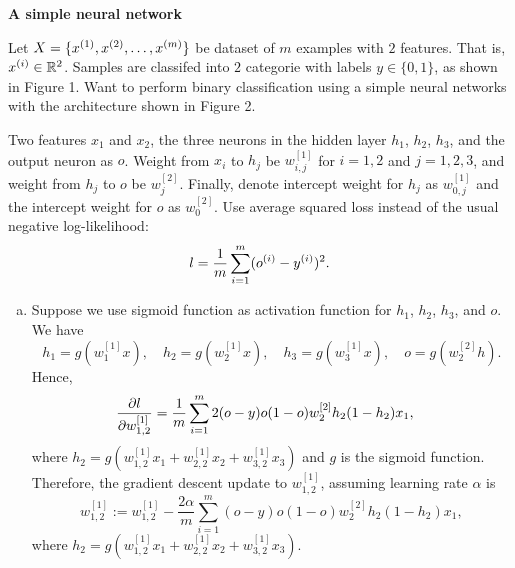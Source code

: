 \documentclass[12pt,letterpaper,boxed]{hmcpset}
\begin{document}

\begin{problem}[Problem 1]
  \textbf{A simple neural network}
  
  Let $X = \{ \xx[1], \xx[2], \dots, \xx[m] \}$ be dataset of $m$ examples with $2$ features. That is, $\xx \in \R^2$. Samples are classifed into $2$ categorie with labels $y \in \{0, 1\}$, as shown in Figure 1. Want to perform binary classification using a simple neural networks with the architecture shown in Figure 2.

  Two features $x_1$ and $x_2$, the three neurons in the hidden layer $h_1$, $h_2$, $h_3$, and the output neuron as $o$. Weight from $x_i$ to $h_j$ be $w_{i,j}^{[1]}$ for $i = 1,2$ and $j = 1,2,3$, and weight from $h_j$ to $o$ be $w_j^{[2]}$. Finally, denote intercept weight for $h_j$ as $w_{0,j}^{[1]}$ and the intercept weight for $o$ as $w_0^{[2]}$. Use average squared loss instead of the usual negative log-likelihood:
  \[
    l = \frac{1}{m} \sum_{i=1}^{m} (\oo - \yy) ^2.
  \]
\end{problem}

\begin{solution}
\begin{enumerate}[(a)]
  \item Suppose we use sigmoid function as activation function for $h_1$, $h_2$, $h_3$, and $o$. We have
  \[
    h_1 = g(w_1^{[1]} x), \quad h_2 = g(w_2^{[1]} x), \quad h_3 = g(w_3^{[1]} x), \quad o = g(w_2^{[2]} h).
  \]
  Hence, 
  \[
  \begin{aligned}
    \pdv{l}{w_{1,2}^{[1]}} &= 
      \frac{1}{m} \sum_{i=1}^{m} 2 (o-y) o (1-o) w_2^{[2]} h_2 (1-h_2) x_1,
  \end{aligned}
  \]
  where $h_2 = g(w_{1,2}^{[1]} x_1 + w_{2,2}^{[1]} x_2 + w_{3,2}^{[1]} x_3)$ and $g$ is the sigmoid function.
  Therefore, the gradient descent update to $w_{1,2}^{[1]}$, assuming learning rate $\alpha$ is
  \[
    w_{1,2}^{[1]} := w_{1,2}^{[1]} - \frac{2 \alpha}{m} \sum_{i=1}^{m} (o-y) o (1-o) w_2^{[2]} h_2 (1-h_2) x_1,
  \]
  where $h_2 = g(w_{1,2}^{[1]} x_1 + w_{2,2}^{[1]} x_2 + w_{3,2}^{[1]} x_3)$.

\end{enumerate}
\end{solution}
\end{document}
